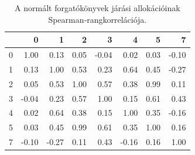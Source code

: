 \begin{table}[htbp]
\centering
\small
\caption{A normált forgatókönyvek járási allokációinak Spearman‑rangkorrelációja.}
\label{tab:spearman}
\begin{tabular}{lrrrrrrr}
\toprule
 & 0 & 1 & 2 & 3 & 4 & 5 & 7 \\
\midrule
0 & 1.00 & 0.13 & 0.05 & -0.04 & 0.02 & 0.03 & -0.10 \\
1 & 0.13 & 1.00 & 0.53 & 0.23 & 0.64 & 0.45 & -0.27 \\
2 & 0.05 & 0.53 & 1.00 & 0.57 & 0.38 & 0.99 & 0.11 \\
3 & -0.04 & 0.23 & 0.57 & 1.00 & 0.15 & 0.61 & 0.43 \\
4 & 0.02 & 0.64 & 0.38 & 0.15 & 1.00 & 0.35 & -0.16 \\
5 & 0.03 & 0.45 & 0.99 & 0.61 & 0.35 & 1.00 & 0.16 \\
7 & -0.10 & -0.27 & 0.11 & 0.43 & -0.16 & 0.16 & 1.00 \\
\bottomrule
\end{tabular}
\end{table}
